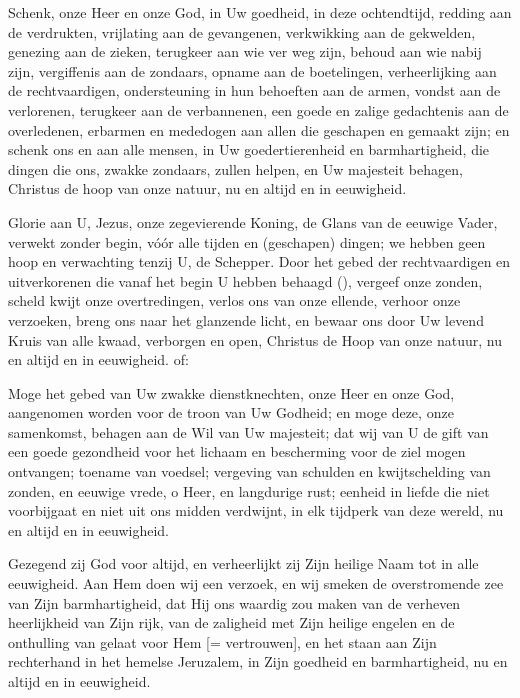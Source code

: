 \documentclass[12pt,twoside,a5paper]{article}
\begin{document}


\begin{halfparskip}
  Schenk, onze Heer en onze God, in Uw goedheid, in deze ochtendtijd, redding aan de verdrukten, vrijlating aan de gevangenen, verkwikking aan de gekwelden, genezing aan de zieken, terugkeer aan wie ver weg zijn, behoud aan wie nabij zijn, vergiffenis aan de zondaars, opname aan de boetelingen, verheerlijking aan de rechtvaardigen, ondersteuning in hun behoeften aan de armen, vondst aan de verlorenen, terugkeer aan de verbannenen, een goede en zalige gedachtenis aan de overledenen, erbarmen en mededogen aan allen die geschapen en gemaakt zijn; en schenk ons en aan alle mensen, in Uw goedertierenheid en barmhartigheid, die dingen die ons, zwakke zondaars, zullen helpen, en Uw majesteit behagen, Christus de hoop van onze natuur, nu en altijd en in eeuwigheid. 

   Glorie aan U, Jezus, onze zegevierende Koning, de Glans van de eeuwige Vader, verwekt zonder begin, vóór alle tijden en (geschapen) dingen; we hebben geen hoop en verwachting tenzij U, de Schepper. Door het gebed der rechtvaardigen en uitverkorenen die vanaf het begin U hebben behaagd (), vergeef onze zonden, scheld kwijt onze overtredingen, verlos ons van onze ellende, verhoor onze verzoeken, breng ons naar het glanzende licht, en bewaar ons door Uw levend Kruis van alle kwaad, verborgen en open, Christus de Hoop van onze natuur, nu en altijd en in eeuwigheid. of:

   Moge het gebed van Uw zwakke dienstknechten, onze Heer en onze God, aangenomen worden voor de troon van Uw Godheid; en moge deze, onze samenkomst, behagen aan de Wil van Uw majesteit; dat wij van U de gift van een goede gezondheid voor het lichaam en bescherming voor de ziel mogen ontvangen; toename van voedsel; vergeving van schulden en kwijtschelding van zonden, en eeuwige vrede, o Heer, en langdurige rust; eenheid in liefde die niet voorbijgaat en niet uit ons midden verdwijnt, in elk tijdperk van deze wereld, nu en altijd en in eeuwigheid.

   Gezegend zij God voor altijd, en verheerlijkt zij Zijn heilige Naam tot in alle eeuwigheid. Aan Hem doen wij een verzoek, en wij smeken de overstromende zee van Zijn barmhartigheid, dat Hij ons waardig zou maken van de verheven heerlijkheid van Zijn rijk, van de zaligheid met Zijn heilige engelen en de onthulling van gelaat voor Hem [= vertrouwen], en het staan aan Zijn rechterhand in het hemelse Jeruzalem, in Zijn goedheid en barmhartigheid, nu en altijd en in eeuwigheid.


\end{halfparskip}
\end{document}

